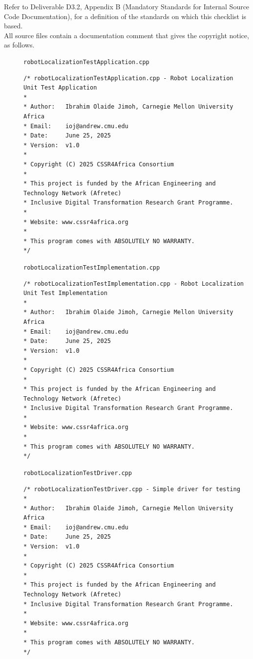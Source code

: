 \documentclass{CSSRforAfrica}
\newcommand{\checkboxChecked}{\fbox{\ding{51}}} %
\begin{document}
Refer to Deliverable D3.2, Appendix B (Mandatory Standards for Internal Source Code Documentation), for a definition of the standards on which this checklist is based.\\

\noindent All source files contain a documentation comment that gives the copyright notice, as follows.
 
\begin{description}

\item[\checkboxChecked] {\small \verb+robotLocalizationTestApplication.cpp+}
{\scriptsize \begin{verbatim}
/* robotLocalizationTestApplication.cpp - Robot Localization Unit Test Application
*
* Author:   Ibrahim Olaide Jimoh, Carnegie Mellon University Africa
* Email:    ioj@andrew.cmu.edu
* Date:     June 25, 2025
* Version:  v1.0
*
* Copyright (C) 2025 CSSR4Africa Consortium
*
* This project is funded by the African Engineering and Technology Network (Afretec)
* Inclusive Digital Transformation Research Grant Programme.
*
* Website: www.cssr4africa.org
*
* This program comes with ABSOLUTELY NO WARRANTY.
*/
\end{verbatim} }

\item[\checkboxChecked] {\small \verb+robotLocalizationTestImplementation.cpp+}
{\scriptsize \begin{verbatim}
/* robotLocalizationTestImplementation.cpp - Robot Localization Unit Test Implementation
*
* Author:   Ibrahim Olaide Jimoh, Carnegie Mellon University Africa
* Email:    ioj@andrew.cmu.edu
* Date:     June 25, 2025
* Version:  v1.0
*
* Copyright (C) 2025 CSSR4Africa Consortium
*
* This project is funded by the African Engineering and Technology Network (Afretec)
* Inclusive Digital Transformation Research Grant Programme.
*
* Website: www.cssr4africa.org
*
* This program comes with ABSOLUTELY NO WARRANTY.
*/
\end{verbatim} }

\item[\checkboxChecked] {\small \verb+robotLocalizationTestDriver.cpp+}
{\scriptsize \begin{verbatim}
/* robotLocalizationTestDriver.cpp - Simple driver for testing
*
* Author:   Ibrahim Olaide Jimoh, Carnegie Mellon University Africa
* Email:    ioj@andrew.cmu.edu
* Date:     June 25, 2025
* Version:  v1.0
*
* Copyright (C) 2025 CSSR4Africa Consortium
*
* This project is funded by the African Engineering and Technology Network (Afretec)
* Inclusive Digital Transformation Research Grant Programme.
*
* Website: www.cssr4africa.org
*
* This program comes with ABSOLUTELY NO WARRANTY.
*/
\end{verbatim} }

\end{description}
\end{document}
